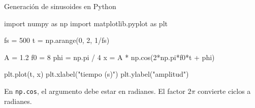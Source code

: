 \documentclass[
  ignorenonframetext,
  aspectratio=169,
  spanish,
  professionalfonts]{beamer}
\newenvironment{Shaded}{\begin{snugshade}}{\end{snugshade}}
\newcommand{\DecValTok}[1]{\textcolor[rgb]{0.68,0.00,0.00}{#1}}
\newcommand{\FloatTok}[1]{\textcolor[rgb]{0.68,0.00,0.00}{#1}}
\newcommand{\ImportTok}[1]{\textcolor[rgb]{0.00,0.46,0.62}{#1}}
\newcommand{\NormalTok}[1]{\textcolor[rgb]{0.00,0.23,0.31}{#1}}
\newcommand{\OperatorTok}[1]{\textcolor[rgb]{0.37,0.37,0.37}{#1}}
\newcommand{\StringTok}[1]{\textcolor[rgb]{0.13,0.47,0.30}{#1}}
\begin{document}
\begin{frame}{Generación de sinusoides en Python}
\protect{}\label{generaciuxf3n-de-sinusoides-en-python}
\begin{Shaded}
\begin{Highlighting}[]
\ImportTok{import}\NormalTok{ numpy }\ImportTok{as}\NormalTok{ np}
\ImportTok{import}\NormalTok{ matplotlib.pyplot }\ImportTok{as}\NormalTok{ plt}

\NormalTok{fs }\OperatorTok{=} \DecValTok{500}
\NormalTok{t }\OperatorTok{=}\NormalTok{ np.arange(}\DecValTok{0}\NormalTok{, }\DecValTok{2}\NormalTok{, }\DecValTok{1}\OperatorTok{/}\NormalTok{fs)}

\NormalTok{A }\OperatorTok{=} \FloatTok{1.2}
\NormalTok{f0 }\OperatorTok{=} \DecValTok{8}
\NormalTok{phi }\OperatorTok{=}\NormalTok{ np.pi }\OperatorTok{/} \DecValTok{4}
\NormalTok{x }\OperatorTok{=}\NormalTok{ A }\OperatorTok{*}\NormalTok{ np.cos(}\DecValTok{2}\OperatorTok{*}\NormalTok{np.pi}\OperatorTok{*}\NormalTok{f0}\OperatorTok{*}\NormalTok{t }\OperatorTok{+}\NormalTok{ phi)}

\NormalTok{plt.plot(t, x)}
\NormalTok{plt.xlabel(}\StringTok{"tiempo (s)"}\NormalTok{)}
\NormalTok{plt.ylabel(}\StringTok{"amplitud"}\NormalTok{)}
\end{Highlighting}
\end{Shaded}

\begin{tcolorbox}[enhanced jigsaw, arc=.35mm, bottomrule=.15mm, bottomtitle=1mm, breakable, colback=white, colbacktitle=quarto-callout-warning-color!10!white, colframe=quarto-callout-warning-color-frame, coltitle=black, left=2mm, leftrule=.75mm, opacityback=0, opacitybacktitle=0.6, rightrule=.15mm, title={Verifique unidades}, titlerule=0mm, toprule=.15mm, toptitle=1mm]

En \texttt{np.cos}, el argumento debe estar en radianes. El factor
\(2\pi\) convierte ciclos a radianes.

\end{tcolorbox}
\end{frame}
\end{document}
